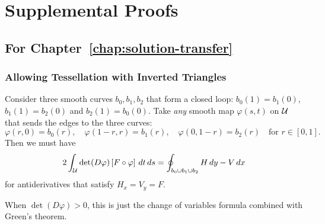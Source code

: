 \chapter{Supplemental Proofs}

\section{For Chapter~\ref{chap:solution-transfer}}

\subsection{Allowing Tessellation with Inverted Triangles}

\begin{lemma}\label{lemma:bad-triangle}
Consider three smooth curves
\(b_0, b_1, b_2\) that form a closed loop: \(b_0(1) = b_1(0)\),
\(b_1(1) = b_2(0)\) and \(b_2(1) = b_0(0)\).
Take \emph{any} smooth map \(\varphi(s, t)\) on \(\mathcal{U}\) that
sends the edges to the three curves:
\begin{equation}
\varphi(r, 0) = b_0(r), \quad \varphi(1 - r, r) = b_1(r),
  \quad \varphi(0, 1 - r) = b_2(r) \quad \text{for } r \in \left[0, 1\right].
\end{equation}
Then we must have
\begin{equation}
2 \int_{\mathcal{U}} \det(D\varphi) \left[F \circ \varphi\right] \, dt \, ds =
\oint_{b_0 \cup b_1 \cup b_2} H \, dy - V \, dx
\end{equation}
for antiderivatives that satisfy \(H_x = V_y = F\).

When \(\det(D\varphi) > 0\), this is just the change of variables
formula combined with Green's theorem.
\end{lemma}

